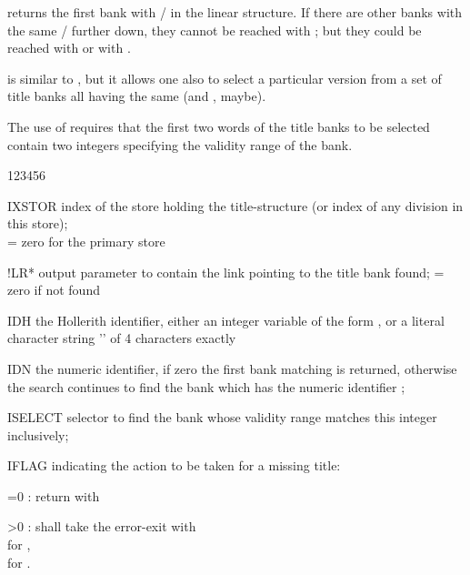  returns the first bank with / 
in the linear structure.
If there are other banks with the same / further down,
they cannot be reached with ;
but they could be reached with 
or with .

 is similar to , but it allows one also to select
a particular version from a set of title banks all having the
same  (and , maybe).

The use of  requires that the first two words of the title banks
to be selected contain two integers specifying the validity range
of the bank.


\begin{DLtt}{123456}
\item[IXSTOR]  index of the store holding the title-structure
               (or index of any division in this store);\\
               = zero for the primary store
\item[!LR*]    output parameter to contain the link pointing
               to the title bank found; = zero if not found
\item[IDH]     the Hollerith identifier,  either
               an integer variable of the form , or
               a literal character string '' of 4 characters exactly
\item[IDN]     the numeric identifier,
               if zero the first bank matching  is returned,
               otherwise the search continues to find the bank 
               which has the numeric identifier ;
\item[ISELECT] selector to find the bank whose validity range
               matches this integer inclusively;
\item[IFLAG]   indicating the action to be taken for a missing title:
            \begin{DLtt}{12}
            \item[=0]:  return with 
            \item[>0]:   shall take the error-exit
                          with \\
                            for ,\\
                         for .
            \end{DLtt}
\end{DLtt}

